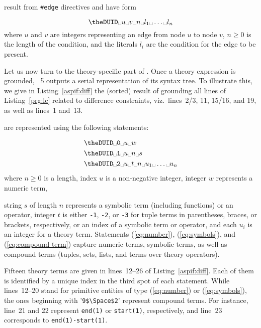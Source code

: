  result from \lstinline{#edge} directives and have form
\addtocounter{DUID}{1}
\[\texttt{\theDUID} \Space u \Space v \Space n  \Space l_1 \Space \dots \Space l_n\]
where
$u$ and $v$ are integers representing an edge from node $u$ to node $v$,
$n \geq 0$ is the length of the condition, and
the literals $l_i$ are the condition for the edge to be present.

Let us now turn to the theory-specific part of \aspif.
Once a theory expression is grounded,
\gringo~5 %
outputs a serial representation of its syntax tree.
To illustrate this,
we give in Listing~\ref{aspif:diff} the (sorted) result of grounding all lines of Listing~\ref{prg:lc} related to difference constraints,
viz.\ lines~2/3, 11, 15/16, and 19, as well as lines~1 and~13.

 are represented using the following statements:
\addtocounter{DUID}{1}
\begin{align}
\texttt{\theDUID} \Space \texttt{0} & \Space u \Space w \label{eq:number}\\
\texttt{\theDUID} \Space \texttt{1} & \Space u \Space n \Space s \label{eq:symbols}\\
\texttt{\theDUID} \Space \texttt{2} & \Space u \Space t \Space n \Space u_1 \Space \dots \Space u_n \label{eq:compound-term}
\end{align}
where
$n \geq 0$ is a length,
index $u$ is a non-negative integer,
integer $w$ represents a numeric term,

%
string $s$ of length $n$ represents a symbolic term (including functions) or an operator,
integer $t$ is either \texttt{-1}, \texttt{-2}, or \texttt{-3} for tuple terms in parentheses, braces, or brackets, respectively, or an index of a symbolic term or operator, and
each $u_i$ is an integer for a theory term.
%
Statements (\ref{eq:number}), (\ref{eq:symbols}), and (\ref{eq:compound-term})
capture
numeric terms,
symbolic terms, %
as well as
compound terms (tuples, sets, lists, and terms over theory operators).

Fifteen theory terms are given in lines~12--26 of Listing~\ref{aspif:diff}.
Each of them is identified by a unique index in the third spot of each statement.
While lines~12--20 stand for primitive entities of type (\ref{eq:number}) or (\ref{eq:symbols}),
the ones beginning with '\lstinline[mathescape=t]{9$\Space$2}' represent compound terms.
For instance, line~21 and 22 represent \lstinline{end(1)} or  \lstinline{start(1)}, respectively,
and line~23 corresponds to \lstinline{end(1)-start(1)}.

